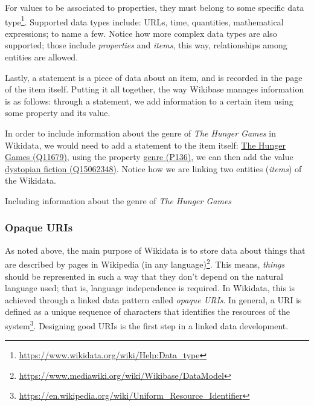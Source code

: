 For values to be associated to properties, they must belong to some specific data type\footnote{\url{https://www.wikidata.org/wiki/Help:Data_type}}. Supported data types include: URLs, time, quantities, mathematical expressions; to name a few. Notice how more complex data types are also supported; those include \textit{properties} and \textit{items}, this way, relationships among entities are allowed.

Lastly, a statement is a piece of data about an item, and is recorded in the page of the item itself. Putting it all together, the way Wikibase manages information is as follows: through a statement, we add information to a certain item using some property and its value.

\begin{example}
    \label{example:wikibaseGraph}
    In order to include information about the genre of \textit{The Hunger Games} in Wikidata, we would need to add a statement to the item itself: \href{https://www.wikidata.org/wiki/Q11679}{The Hunger Games (Q11679)}, using the property \href{https://www.wikidata.org/wiki/Property:P136}{genre (P136)}, we can then add the value \href{https://www.wikidata.org/wiki/Q15062348}{dystopian fiction (Q15062348)}. Notice how we are linking two entities (\textit{items}) of the Wikidata.
\end{example}

\begin{table}[ht]
    \centering
    
    \caption[Including information about the genre of \textit{The Hunger Games}]{Including information about the genre of \textit{The Hunger Games}\footnotemark}
    \label{tab:language}
\end{table}

\subsubsection{Opaque URIs}
\label{section:opaqueURIs}

As noted above, the main purpose of Wikidata is to store data about things that are described by pages in Wikipedia (in any language)\footnote{\url{https://www.mediawiki.org/wiki/Wikibase/DataModel}}. This means, \textit{things} should be represented in such a way that they don't depend on the natural language used; that is, language independence is required. In Wikidata, this is achieved through a linked data pattern called \textit{opaque URIs}. In general, a URI is defined as a unique sequence of characters that identifies the resources of the system\footnote{\url{https://en.wikipedia.org/wiki/Uniform_Resource_Identifier}}. Designing good URIs is the first step in a linked data development.

